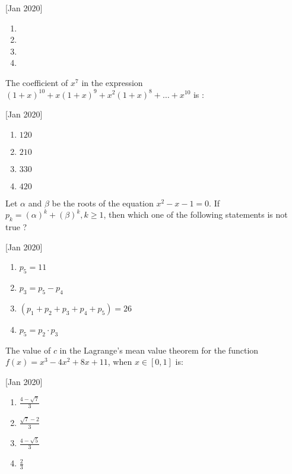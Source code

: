     \hfill[Jan 2020]
        \begin{enumerate}
            \item {}
            \item {}
            \item {}
            \item {}
        \end{enumerate}

    \item The coefficient of $x^7$ in the expression $(1 + x)^{10} + x(1 + x)^9 + x^2(1 + x)^8 +\dots+x^{10}$ is :
    
    \hfill[Jan 2020]
        \begin{enumerate}
            \item $120$
            \item $210$
            \item $330$
            \item $420$
        \end{enumerate}

    \item Let $\alpha$ and $\beta$ be the roots of the equation $x^2-x-1=0$. If $p_k=(\alpha)^k+(\beta)^k,k\geq1$, then which one of the following statements is not true ?
    
    \hfill[Jan 2020]
        \begin{enumerate}
            \item $p_5=11$
            \item $p_3=p_5-p_4$
            \item $(p_1+p_2+p_3+p_4+p_5)=26$
            \item $p_5=p_2\cdot p_3$
        \end{enumerate}

    \item The value of $c$ in the Lagrange's mean value theorem for the function $f(x)=x^3-4x^2+8x+11$, when $x\in[0,1]$ is:
    
    \hfill[Jan 2020]
        \begin{enumerate}
            \item $\frac{4-\sqrt{7}}{3}$
            \item $\frac{\sqrt{7}-2}{3}$
            \item $\frac{4-\sqrt{5}}{3}$
            \item $\frac{2}{3}$
        \end{enumerate}

